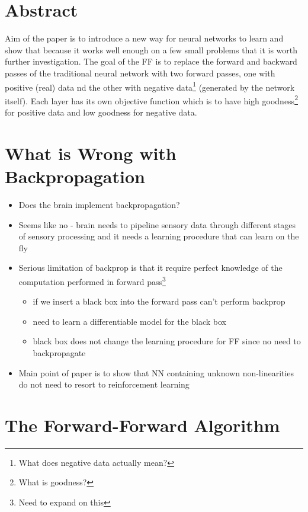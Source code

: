 
\section{Abstract}

Aim of the paper is to introduce a new way for neural networks to learn and show that because it works well enough on a few small problems that it is worth further investigation. The goal of the FF is to replace the forward and backward passes of the traditional neural network with two forward passes, one with positive (real) data nd the other with negative data\footnote{What does negative data actually mean?} (generated by the network itself). Each layer has its own objective function which is to have high goodness\footnote{What is goodness?} for positive data and low goodness for negative data. 


\section{What is Wrong with Backpropagation}

\begin{itemize}
    \item Does the brain implement backpropagation?
    \item Seems like no - brain needs to pipeline sensory data through different stages of sensory processing and it needs a learning procedure that can learn on the fly
    \item Serious limitation of backprop is that it require perfect knowledge of the computation performed in forward pass\footnote{Need to expand on this}
    \begin{itemize}
        \item if we insert a black box into the forward pass can't perform backprop
        \item need to learn a differentiable model for the black box
        \item black box does not change the learning procedure for FF since no need to backpropagate
    \end{itemize}

    \item Main point of paper is to show that NN containing unknown non-linearities do not need to resort to reinforcement learning

\end{itemize}


\section{The Forward-Forward Algorithm}

